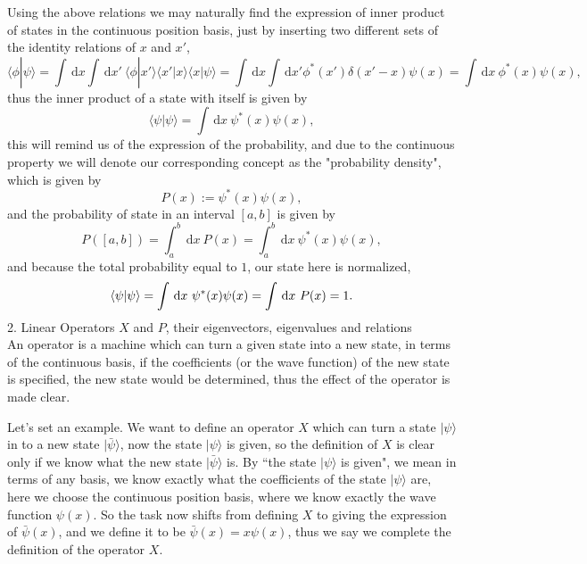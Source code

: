 \documentclass{article}
\newcommand{\be}{\begin{equation}}
\newcommand{\ee}{\end{equation}}
\newcommand{\dif}{\,\mathrm{d}}
\renewcommand{\1}{\left}
\renewcommand{\2}{\right}
\newcommand{\la}{\langle}
\newcommand{\ra}{\rangle}
\newcommand{\del}{\delta}
\begin{document}
Using the above relations we may naturally find the expression of inner product of states in the continuous position basis, just by inserting two different sets of the identity relations of $x$ and $x'$,
\be
\la \phi|\psi\ra = \int \dif x \int \dif x' \ \la \phi|x'\ra\la x'|x\ra\la x|\psi\ra=\int \dif x \int \dif x' \phi^*(x') \del(x'-x) \psi(x)=\int \dif x \ \phi^*(x)\psi(x),
\ee
thus the inner product of a state with itself is given by
\be
\la \psi|\psi\ra =\int \dif x \ \psi^*(x)\psi(x),
\ee
this will remind us of the expression of the probability, and due to the continuous property we will denote our corresponding concept as the "probability density", which is given by
\be
P(x):=\psi^*(x)\psi(x),
\ee
and the probability of state in an interval $[a,b]$ is given by
\be
P([a,b])=\int_a^b \dif x\ P(x)=\int_a^b \dif x\ \psi^*(x)\psi(x),
\ee
and because the total probability equal to $1$, our state here is normalized,
\be
\la \psi|\psi\ra =\int \dif x \ \psi^*(x)\psi(x)=\int  \dif x\ P(x)=1.\\
\ee
2. Linear Operators $X$ and $P$, their eigenvectors, eigenvalues and relations\\

An operator is a machine which can turn a given state into a new state, in terms of the continuous basis, if the coefficients (or the wave function) of the new state is specified, the new state would be determined, thus the effect of the operator is made clear.

Let's set an example. We want to define an operator $X$ which can turn a state $|\psi\ra$ in to a new state $|\bar\psi\ra$, now the state $|\psi\ra$ is given, so the definition of $X$ is clear only if we know what the new state $|\bar\psi\ra$ is. By ``the state $|\psi\ra$ is given", we mean in terms of any basis, we know exactly what the coefficients of the state $|\psi\ra$ are, here we choose the continuous position basis, where we know exactly the wave function $\psi(x)$. So the task now shifts from defining $X$ to giving the expression of $\bar\psi(x)$, and we define it to be $\bar\psi(x)=x\psi(x)$, thus we say we complete the definition of the operator $X$.
\end{document}
